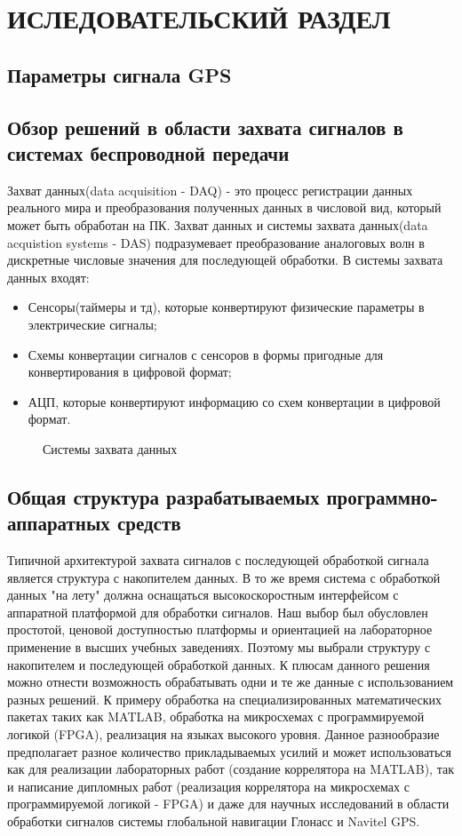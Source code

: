 \section{ИСЛЕДОВАТЕЛЬСКИЙ РАЗДЕЛ}
\subsection{Параметры сигнала GPS}
\label{razdel13}
\subsection{Обзор решений в области захвата сигналов в системах беспроводной передачи}
\label{razdel13}
Захват данных(data acquisition - DAQ) - это процесс регистрации данных реального мира и преобразования полученных данных в 
числовой вид, который может быть обработан на ПК. Захват данных и системы захвата данных(data acquistion systems - DAS) подразумевает
преобразование аналоговых волн в дискретные числовые значения для последующей обработки. В системы захвата данных входят:

\begin{itemize}
\item Сенсоры(таймеры и тд), которые конвертируют физические параметры в электрические сигналы;
\item Схемы конвертации сигналов с сенсоров в формы пригодные для конвертирования в цифровой формат;
\item АЦП, которые конвертируют информацию со схем конвертации в цифровой формат.
\end{itemize}

\begin{figure}[H]
\caption{Системы захвата данных}
\label{pic_acq}
\end{figure}

\subsection{Общая структура разрабатываемых программно-аппаратных средств}
\label{razdel13}

Типичной архитектурой захвата сигналов с последующей обработкой сигнала является структура с накопителем данных. В то же время
система с обработкой данных "на лету" должна оснащаться высокоскоростным интерфейсом с аппаратной платформой для обработки
сигналов. Наш выбор был обусловлен простотой, ценовой доступностью платформы и ориентацией на лабораторное применение
в высших учебных заведениях. Поэтому мы выбрали структуру с накопителем и последующей обработкой данных. К плюсам данного решения
можно отнести возможность обрабатывать одни и те же данные с использованием разных решений. К примеру обработка на специализированных
математических пакетах таких как MATLAB, обработка на микросхемах с программируемой логикой (FPGA), реализация на языках высокого уровня.
Данное разнообразие предполагает разное количество прикладываемых усилий и может использоваться как для реализации лабораторных работ
(создание коррелятора на MATLAB), так и написание дипломных работ (реализация коррелятора на микросхемах с программируемой логикой - FPGA) и
даже для научных исследований в области обработки сигналов системы глобальной навигации Глонасс и Navitel GPS.

